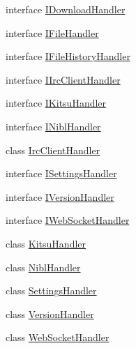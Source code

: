 \begin{DoxyCompactItemize}
\item 
interface \mbox{\hyperlink{interface_little_weeb_library_1_1_handlers_1_1_i_download_handler}{I\+Download\+Handler}}
\item 
interface \mbox{\hyperlink{interface_little_weeb_library_1_1_handlers_1_1_i_file_handler}{I\+File\+Handler}}
\item 
interface \mbox{\hyperlink{interface_little_weeb_library_1_1_handlers_1_1_i_file_history_handler}{I\+File\+History\+Handler}}
\item 
interface \mbox{\hyperlink{interface_little_weeb_library_1_1_handlers_1_1_i_irc_client_handler}{I\+Irc\+Client\+Handler}}
\item 
interface \mbox{\hyperlink{interface_little_weeb_library_1_1_handlers_1_1_i_kitsu_handler}{I\+Kitsu\+Handler}}
\item 
interface \mbox{\hyperlink{interface_little_weeb_library_1_1_handlers_1_1_i_nibl_handler}{I\+Nibl\+Handler}}
\item 
class \mbox{\hyperlink{class_little_weeb_library_1_1_handlers_1_1_irc_client_handler}{Irc\+Client\+Handler}}
\item 
interface \mbox{\hyperlink{interface_little_weeb_library_1_1_handlers_1_1_i_settings_handler}{I\+Settings\+Handler}}
\item 
interface \mbox{\hyperlink{interface_little_weeb_library_1_1_handlers_1_1_i_version_handler}{I\+Version\+Handler}}
\item 
interface \mbox{\hyperlink{interface_little_weeb_library_1_1_handlers_1_1_i_web_socket_handler}{I\+Web\+Socket\+Handler}}
\item 
class \mbox{\hyperlink{class_little_weeb_library_1_1_handlers_1_1_kitsu_handler}{Kitsu\+Handler}}
\item 
class \mbox{\hyperlink{class_little_weeb_library_1_1_handlers_1_1_nibl_handler}{Nibl\+Handler}}
\item 
class \mbox{\hyperlink{class_little_weeb_library_1_1_handlers_1_1_settings_handler}{Settings\+Handler}}
\item 
class \mbox{\hyperlink{class_little_weeb_library_1_1_handlers_1_1_version_handler}{Version\+Handler}}
\item 
class \mbox{\hyperlink{class_little_weeb_library_1_1_handlers_1_1_web_socket_handler}{Web\+Socket\+Handler}}
\end{DoxyCompactItemize}
